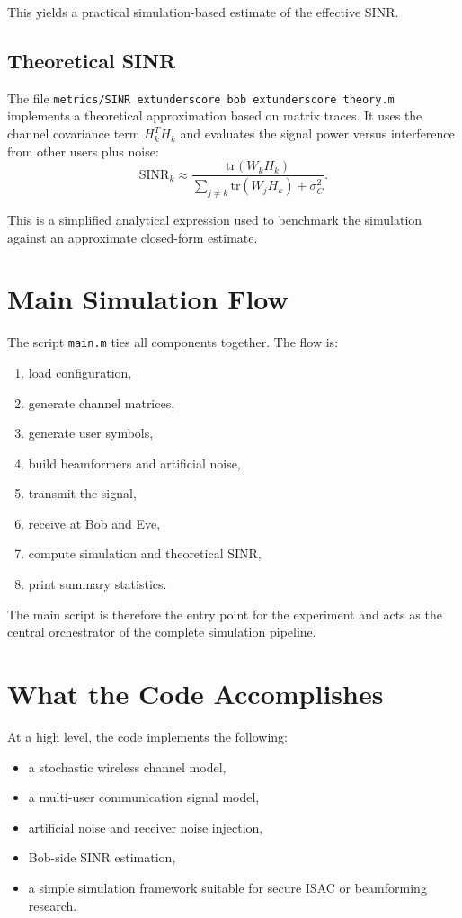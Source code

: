 \documentclass[12pt]{article}
\begin{document}
This yields a practical simulation-based estimate of the effective SINR.

\subsection{Theoretical SINR}
The file \texttt{metrics/SINR	extunderscore bob	extunderscore theory.m} implements a theoretical approximation based on matrix traces. It uses the channel covariance term $H_k^T H_k$ and evaluates the signal power versus interference from other users plus noise:
\begin{equation}
\text{SINR}_k \approx \frac{\mathrm{tr}(W_k H_k)}{\sum_{j \neq k} \mathrm{tr}(W_j H_k) + \sigma_C^2}.
\end{equation}

This is a simplified analytical expression used to benchmark the simulation against an approximate closed-form estimate.

\section{Main Simulation Flow}
The script \texttt{main.m} ties all components together. The flow is:

\begin{enumerate}[leftmargin=*]
    \item load configuration,
    \item generate channel matrices,
    \item generate user symbols,
    \item build beamformers and artificial noise,
    \item transmit the signal,
    \item receive at Bob and Eve,
    \item compute simulation and theoretical SINR,
    \item print summary statistics.
\end{enumerate}

The main script is therefore the entry point for the experiment and acts as the central orchestrator of the complete simulation pipeline.

\section{What the Code Accomplishes}
At a high level, the code implements the following:

\begin{itemize}[leftmargin=*]
    \item a stochastic wireless channel model,
    \item a multi-user communication signal model,
    \item artificial noise and receiver noise injection,
    \item Bob-side SINR estimation,
    \item a simple simulation framework suitable for secure ISAC or beamforming research.
\end{itemize}
\end{document}
